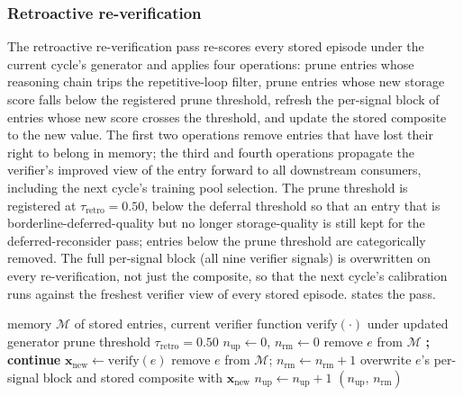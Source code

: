 \subsubsection{Retroactive re-verification}
\label{sec:retroverify}

The retroactive re-verification pass re-scores every stored episode under the current cycle's generator and applies four operations: prune entries whose reasoning chain trips the repetitive-loop filter, prune entries whose new storage score falls below the registered prune threshold, refresh the per-signal block of entries whose new score crosses the threshold, and update the stored composite to the new value. The first two operations remove entries that have lost their right to belong in memory; the third and fourth operations propagate the verifier's improved view of the entry forward to all downstream consumers, including the next cycle's training pool selection. The prune threshold is registered at $\tau_{\text{retro}} = 0.50$, below the deferral threshold so that an entry that is borderline-deferred-quality but no longer storage-quality is still kept for the deferred-reconsider pass; entries below the prune threshold are categorically removed. The full per-signal block (all nine verifier signals) is overwritten on every re-verification, not just the composite, so that the next cycle's calibration runs against the freshest verifier view of every stored episode.  states the pass.

\begin{algorithm}[!htbp]
\caption[Retroactive re-verification pass (Stage~8a).]{Retroactive re-verification pass (Stage~8a).}
\label{alg:retroverify}
\begin{algorithmic}[1]
\Require memory $\mathcal{M}$ of stored entries, current verifier function $\mathrm{verify}(\cdot)$ under updated generator
\Require prune threshold $\tau_{\text{retro}} = 0.50$
\State $n_{\text{up}} \gets 0$, $n_{\text{rm}} \gets 0$
        \State remove $e$ from $\mathcal{M}$ \textbf{; continue}
    \EndIf
    \State $\mathbf{x}_{\text{new}} \gets \mathrm{verify}(e)$ 
        \State remove $e$ from $\mathcal{M}$; $n_{\text{rm}} \gets n_{\text{rm}} + 1$
    \Else
        \State overwrite $e$'s per-signal block and stored composite with $\mathbf{x}_{\text{new}}$
        \State $n_{\text{up}} \gets n_{\text{up}} + 1$
    \EndIf
\EndFor
\State \Return $(n_{\text{up}},\, n_{\text{rm}})$
\end{algorithmic}
\end{algorithm}

